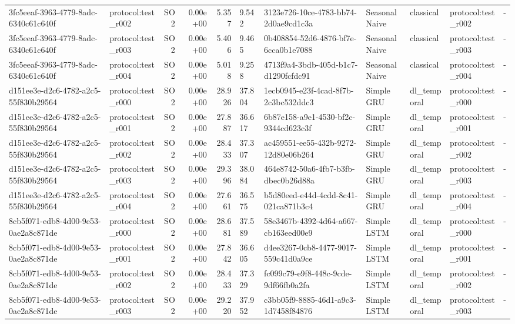 \begin{table}[htbp]
\begin{tabular}{llrrr}
3fc5eeaf-3963-4779-8adc-6340c61c640f & protocol:test\_r002 & SO2 & 0.00e+00 & 5.357 & 9.542 & 3123e726-10ce-4783-bb74-2d0ae9cd1c3a & SeasonalNaive & classical & protocol:test\_r002 & - \\
3fc5eeaf-3963-4779-8adc-6340c61c640f & protocol:test\_r003 & SO2 & 0.00e+00 & 5.406 & 9.465 & 0b408854-52d6-4876-bf7e-6cca0b1e7088 & SeasonalNaive & classical & protocol:test\_r003 & - \\
3fc5eeaf-3963-4779-8adc-6340c61c640f & protocol:test\_r004 & SO2 & 0.00e+00 & 5.018 & 9.258 & 4713f9a4-3bdb-405d-b1c7-d1290fcfdc91 & SeasonalNaive & classical & protocol:test\_r004 & - \\
d151ee3e-d2c6-4782-a2c5-55f830b29564 & protocol:test\_r000 & SO2 & 0.00e+00 & 28.926 & 37.804 & 1ecb0945-e23f-4cad-8f7b-2c3bc532ddc3 & Simple GRU & dl\_temporal & protocol:test\_r000 & - \\
d151ee3e-d2c6-4782-a2c5-55f830b29564 & protocol:test\_r001 & SO2 & 0.00e+00 & 27.887 & 36.617 & 6b87e158-a9e1-4530-bf2c-9344cd623c3f & Simple GRU & dl\_temporal & protocol:test\_r001 & - \\
d151ee3e-d2c6-4782-a2c5-55f830b29564 & protocol:test\_r002 & SO2 & 0.00e+00 & 28.433 & 37.307 & ac459551-ee55-432b-9272-12d80e06b264 & Simple GRU & dl\_temporal & protocol:test\_r002 & - \\
d151ee3e-d2c6-4782-a2c5-55f830b29564 & protocol:test\_r003 & SO2 & 0.00e+00 & 29.396 & 38.084 & 464e8742-50a6-4fb7-b3fb-dbec0b26d88a & Simple GRU & dl\_temporal & protocol:test\_r003 & - \\
d151ee3e-d2c6-4782-a2c5-55f830b29564 & protocol:test\_r004 & SO2 & 0.00e+00 & 27.661 & 36.575 & b5d80eed-e44d-4cdd-8c41-021ca871b3c4 & Simple GRU & dl\_temporal & protocol:test\_r004 & - \\
8cb5f071-edb8-4d00-9e53-0ae2a8c871de & protocol:test\_r000 & SO2 & 0.00e+00 & 28.681 & 37.589 & 58e3467b-4392-4d64-a667-cb163eed00e9 & Simple LSTM & dl\_temporal & protocol:test\_r000 & - \\
8cb5f071-edb8-4d00-9e53-0ae2a8c871de & protocol:test\_r001 & SO2 & 0.00e+00 & 27.842 & 36.605 & d4ee3267-0cb8-4477-9017-559c41d0a9ce & Simple LSTM & dl\_temporal & protocol:test\_r001 & - \\
8cb5f071-edb8-4d00-9e53-0ae2a8c871de & protocol:test\_r002 & SO2 & 0.00e+00 & 28.433 & 37.329 & fc099c79-e9f8-448c-9cde-9df66fb0a2fa & Simple LSTM & dl\_temporal & protocol:test\_r002 & - \\
8cb5f071-edb8-4d00-9e53-0ae2a8c871de & protocol:test\_r003 & SO2 & 0.00e+00 & 29.220 & 37.952 & c3bb05f9-8885-46d1-a9c3-1d7458f84876 & Simple LSTM & dl\_temporal & protocol:test\_r003 & - \\

\end{tabular}
\end{table}
